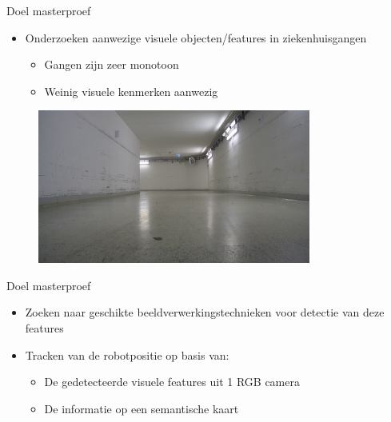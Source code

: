 \documentclass[11pt,t]{beamer}
\begin{document}
\begin{frame}[fragile]{Doel masterproef}
	\begin{itemize}
		\item Onderzoeken aanwezige visuele objecten/features in ziekenhuisgangen
		\begin{itemize}
			\item Gangen zijn zeer monotoon
			\item Weinig visuele kenmerken aanwezig
		\end{itemize}
	\end{itemize}
	\begin{figure}
		\centering
		\includegraphics[width=0.8\textwidth]{graphics/gang.png}
	\end{figure}
\end{frame}
\begin{frame}{Doel masterproef}
	\begin{itemize}
		\item Zoeken naar geschikte beeldverwerkingstechnieken voor detectie van deze features
		\item Tracken van de robotpositie op basis van:
		\begin{itemize}
			\item De gedetecteerde visuele features uit 1 RGB camera
			\item De informatie op een semantische kaart
		\end{itemize}
	\end{itemize}
\end{frame}



\end{document}
